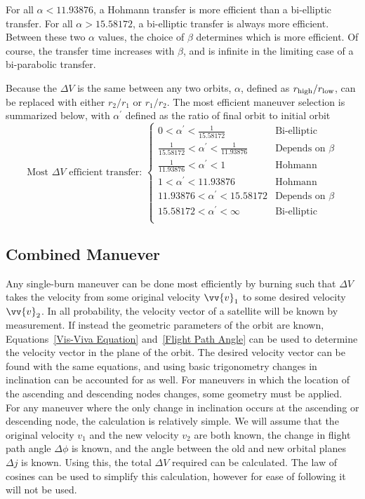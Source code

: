 \documentclass[../basicOrbitalDynamics.tex]{subfiles}
\begin{document}
For all $\alpha<11.93876$, a Hohmann transfer is more efficient than a bi-elliptic transfer. For all $\alpha>15.58172$, a bi-elliptic transfer is always more efficient. Between these two $\alpha$ values, the choice of $\beta$ determines which is more efficient. Of course, the transfer time increases with $\beta$, and is infinite in the limiting case of a bi-parabolic transfer.

Because the $\Delta V$ is the same between any two orbits, $\alpha$, defined as ${r}_\text{high}/{r}_\text{low}$, can be replaced with either $r_2/r_1$ or $r_1/r_2$. The most efficient maneuver selection is summarized below, with $\alpha^\prime$ defined as the ratio of final orbit to initial orbit
\begin{equation*}
    \text{Most }\Delta V\text{ efficient transfer: }
    \begin{cases}
        0<\alpha^\prime<\frac{1}{15.58172}                  & \text{Bi-elliptic} \\
        \frac{1}{15.58172}<\alpha^\prime<\frac{1}{11.93876} & \text{Depends on }\beta \\
        \frac{1}{11.93876}<\alpha^\prime<1                  & \text{Hohmann} \\
        1<\alpha^\prime<11.93876                            & \text{Hohmann} \\
        11.93876<\alpha^\prime<15.58172                     & \text{Depends on }\beta \\
        15.58172<\alpha^\prime<\infty                       & \text{Bi-elliptic} \\
    \end{cases}
\end{equation*}

\bigskip\bigskip
\subsection{Combined Manuever}

Any single-burn maneuver can be done most efficiently by burning such that $\Delta V$ takes the velocity from some original velocity $\vv{v}_1$ to some desired velocity $\vv{v}_2$. In all probability, the velocity vector of a satellite will be known by measurement. If instead the geometric parameters of the orbit are known, Equations~\eqref{Vis-Viva Equation} and~\eqref{Flight Path Angle} can be used to determine the velocity vector in the plane of the orbit. The desired velocity vector can be found with the same equations, and using basic trigonometry changes in inclination can be accounted for as well. For maneuvers in which the location of the ascending and descending nodes changes, some geometry must be applied. For any maneuver where the only change in inclination occurs at the ascending or descending node, the calculation is relatively simple. We will assume that the original velocity $v_1$ and the new velocity $v_2$ are both known, the change in flight path angle $\Delta \phi$ is known, and the angle between the old and new orbital planes $\Delta j$ is known. Using this, the total $\Delta V$ required can be calculated. The law of cosines can be used to simplify this calculation, however for ease of following it will not be used.
\end{document}
